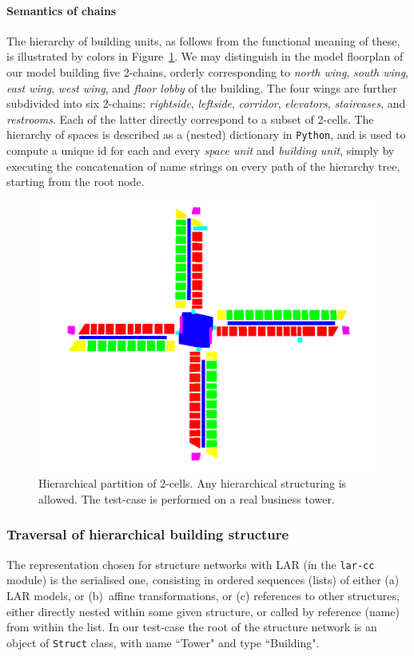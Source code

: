 \documentclass[]{egpubl}
\begin{document}
\paragraph*{Semantics of chains}

The hierarchy of building units, as follows from the functional meaning of these, is illustrated by colors in Figure~\ref{fig:input-png6}. We may distinguish in the model floorplan of our model building five 2-chains, orderly corresponding to \emph{north wing}, \emph{south wing}, \emph{east wing}, \emph{west  wing}, and \emph{floor lobby} of the building. The four wings are further subdivided into six 2-chains: \emph{rightside}, \emph{leftside}, \emph{corridor}, \emph{elevators}, \emph{staircases}, and \emph{restrooms}. Each of the latter directly correspond to a subset of 2-cells. The hierarchy of spaces is described as a (nested) dictionary in \texttt{Python}, and is used to compute  a unique id for each and every \emph{space unit} and \emph{building unit}, simply by executing the concatenation of name strings on every path of the hierarchy tree, starting from the root node.

\begin{figure}[htbp] %
   \centering
   \includegraphics[width=0.7\linewidth]{images/input-colors} 
   \caption{Hierarchical partition of 2-cells. Any hierarchical structuring is allowed. The test-case is performed on a real business tower.}
   \label{fig:input-png6}
\end{figure}

\subsubsection*{Traversal of hierarchical building structure}

The representation chosen for structure networks with LAR (in the \texttt{lar-cc} module) is the serialised one, consisting in ordered sequences (lists) of either (a) LAR models, or (b)~affine transformations, or (c) references to other structures, either directly nested within some given structure, or called by reference (name) from within the list.
In our test-case the root of the structure network is an object of \texttt{Struct} class, with name ``Tower" and type ``Building". 
\end{document}
